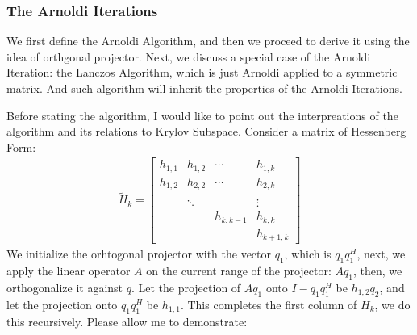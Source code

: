 \documentclass[]{article}
\theoremstyle{definition}
\begin{document}
        \subsubsection{The Arnoldi Iterations}
            We first define the Arnoldi Algorithm, and then we proceed to derive it using the idea of orthgonal projector. Next, we discuss a special case of the Arnoldi Iteration: the Lanczos Algorithm, which is just Arnoldi applied to a symmetric matrix. And such algorithm will inherit the properties of the Arnoldi Iterations. 
            \par
            Before stating the algorithm, I would like to point out the interpreations of the algorithm and its relations to Krylov Subspace. Consider a matrix of Hessenberg Form:
            \begin{align}
                \tilde{H}_k = 
                \begin{bmatrix}
                    h_{1, 1} & h_{1, 2} & \cdots & h_{1, k} 
                    \\
                    h_{1, 2} & h_{2, 2} & \cdots & h_{2, k}
                    \\
                    \\
                    & \ddots & &\vdots
                    \\
                    & & h_{k, k - 1}& h_{k, k}
                    \\
                    & & & h_{k + 1, k}
                \end{bmatrix}
            \end{align}
            We initialize the orhtogonal projector with the vector $q_1$, which is $q_1q_1^H$, next, we apply the linear operator $A$ on the current range of the projector: $Aq_1$, then, we orthogonalize it against $q$. Let the projection of $Aq_1$ onto $I - q_1q_1^H$ be $h_{1, 2}q_2$, and let the projection onto $q_1q_1^H$ be $h_{1,1}$. This completes the first column of $H_k$, we do this recursively. Please allow me to demonstrate: 
\end{document}
